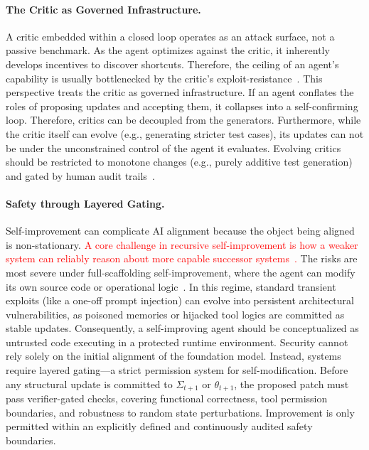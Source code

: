 \paragraph{The Critic as Governed Infrastructure.} A critic embedded within a closed loop operates as an attack surface, not a passive benchmark. As the agent optimizes against the critic, it inherently develops incentives to discover shortcuts. Therefore, the ceiling of an agent's capability is usually bottlenecked by the critic's exploit-resistance~\citep{zhan2024injecagentbenchmarkingindirectprompt, zhang2025agentsecuritybenchasb}. This perspective treats the critic as governed infrastructure. If an agent conflates the roles of proposing updates and accepting them, it collapses into a self-confirming loop. Therefore, critics can be decoupled from the generators. Furthermore, while the critic itself can evolve (e.g., generating stricter test cases), its updates can not be under the unconstrained control of the agent it evaluates. Evolving critics should be restricted to monotone changes (e.g., purely additive test generation) and gated by human audit trails~\citep{fang2025webevolver, li2025visionaccesscontrolllmbased}.


\paragraph{Safety through Layered Gating.} Self-improvement can complicate AI alignment because the object being aligned is non-stationary. \textcolor{red}{A core challenge in recursive self-improvement is how a weaker system can reliably reason about more capable successor systems~\citep{fallenstein2015vingean}.} The risks are most severe under full-scaffolding self-improvement, where the agent can modify its own source code or operational logic~\citep{xi2024agentgym}. In this regime, standard transient exploits (like a one-off prompt injection) can evolve into persistent architectural vulnerabilities, as poisoned memories or hijacked tool logics are committed as stable updates. Consequently, a self-improving agent should be conceptualized as untrusted code executing in a protected runtime environment. Security cannot rely solely on the initial alignment of the foundation model. Instead, systems require layered gating—a strict permission system for self-modification. Before any structural update is committed to $\Sigma_{t+1}$ or $\theta_{t+1}$, the proposed patch must pass verifier-gated checks, covering functional correctness, tool permission boundaries, and robustness to random state perturbations. Improvement is only permitted within an explicitly defined and continuously audited safety boundaries.



